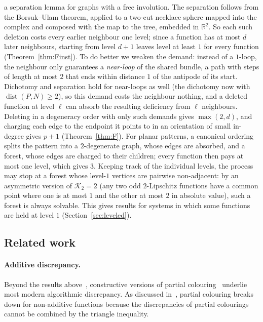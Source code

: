 \documentclass[11pt,letterpaper]{article}
\theoremstyle{definition}
\newcommand{\R}{\mathbb{R}}
\DeclareMathOperator{\dist}{dist}
\begin{document}
a separation lemma for graphs with a free involution. The separation follows from the Borsuk--Ulam
theorem, applied to a two-cut necklace sphere mapped into the complex and composed with the map to
the tree, embedded in $\R^2$. So each such deletion costs every earlier neighbour one level; since a
function has at most $d$ later neighbours, starting from level $d+1$ leaves level at least $1$ for
every function (Theorem~\ref{thm:Finst}). To do better we weaken the demand: instead of a $1$-loop,
the neighbour only guarantees a \emph{near-loop} of the shared bundle, a path with steps of length at
most $2$ that ends within distance $1$ of the antipode of its start. Dichotomy and separation hold for
near-loops as well (the dichotomy now with $\dist(P,N)\ge2$), so this demand costs the neighbour
nothing, and a deleted function at level $\ell$ can absorb the resulting deficiency from $\ell$
neighbours. Deleting in a degeneracy order with only such demands gives $\max(2,d)$, and charging each
edge to the endpoint it points to in an orientation of small in-degree gives $p+1$
(Theorem~\ref{thm:F}). For planar patterns, a canonical ordering splits the pattern into a
$2$-degenerate graph, whose edges are absorbed, and a forest, whose edges are charged to their
children; every function then pays at most one level, which gives $3$. Keeping track of the individual levels, the process
may stop at a forest whose level-$1$ vertices are pairwise non-adjacent: by an asymmetric version
of $\mathcal{K}_2=2$ (any two odd $2$-Lipschitz functions have a common point where one is at most $1$ and the
other at most $2$ in absolute value), such a forest is always solvable. This gives results for systems in which some functions are
held at level $1$ (Section~\ref{sec:leveled}).

\subsection{Related work}\label{sec:related}

\paragraph{Additive discrepancy.}
Beyond the results above~\cite{BF81,Spe85,Ban98,BJ25,BJ26}, constructive versions of partial
colouring~\cite{Ban10,LM15} underlie most modern algorithmic discrepancy. As discussed
in~\cite{HMMS25}, partial colouring breaks down for non-additive functions because the
discrepancies of partial colourings cannot be combined by the triangle inequality.
\end{document}
